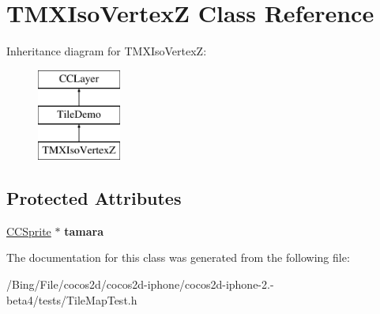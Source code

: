 \hypertarget{interface_t_m_x_iso_vertex_z}{\section{T\-M\-X\-Iso\-Vertex\-Z Class Reference}
\label{interface_t_m_x_iso_vertex_z}
}
Inheritance diagram for T\-M\-X\-Iso\-Vertex\-Z\-:\begin{figure}[H]
\begin{center}
\leavevmode
\includegraphics[height=3.000000cm]{interface_t_m_x_iso_vertex_z}
\end{center}
\end{figure}
\subsection*{Protected Attributes}
\begin{DoxyCompactItemize}
\item 
\hypertarget{interface_t_m_x_iso_vertex_z_a1af6f2982fe000506a6ca745d0d29025}{\hyperlink{class_c_c_sprite}{C\-C\-Sprite} $\ast$ {\bfseries tamara}}\label{interface_t_m_x_iso_vertex_z_a1af6f2982fe000506a6ca745d0d29025}

\end{DoxyCompactItemize}


The documentation for this class was generated from the following file\-:\begin{DoxyCompactItemize}
\item 
/\-Bing/\-File/cocos2d/cocos2d-\/iphone/cocos2d-\/iphone-\/2.-\/beta4/tests/Tile\-Map\-Test.\-h\end{DoxyCompactItemize}
